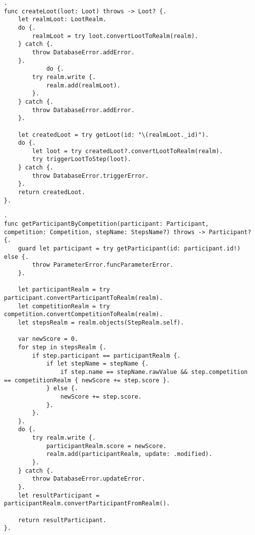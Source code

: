 \begin{lstlisting}[label=lst:code7, caption=Код функции createLoot].
func createLoot(loot: Loot) throws -> Loot? {.
	let realmLoot: LootRealm.
	do {.
		realmLoot = try loot.convertLootToRealm(realm).
	} catch {.
		throw DatabaseError.addError.
	}.
        	do {.
		try realm.write {.
			realm.add(realmLoot).
		}.
	} catch {.
		throw DatabaseError.addError.
	}.
       
	let createdLoot = try getLoot(id: "\(realmLoot._id)").
	do {.
		let loot = try createdLoot?.convertLootToRealm(realm).
		try triggerLootToStep(loot).
	} catch {.
		throw DatabaseError.triggerError.
	}.
	return createdLoot.
}.
\end{lstlisting}

\begin{lstlisting}[label=lst:code8, caption=Код функции getParticipantByCompetition].
func getParticipantByCompetition(participant: Participant, competition: Competition, stepName: StepsName?) throws -> Participant? {.
	guard let participant = try getParticipant(id: participant.id!) else {.
		throw ParameterError.funcParameterError.
	}.
        
	let participantRealm = try participant.convertParticipantToRealm(realm).
	let competitionRealm = try competition.convertCompetitionToRealm(realm).
	let stepsRealm = realm.objects(StepRealm.self).
        
	var newScore = 0.
	for step in stepsRealm {.
		if step.participant == participantRealm {.
			if let stepName = stepName {.
				if step.name == stepName.rawValue && step.competition == competitionRealm { newScore += step.score }.
			} else {.
				newScore += step.score.
			}.
		}.
	}.
	do {.
		try realm.write {.
			participantRealm.score = newScore.
			realm.add(participantRealm, update: .modified).
		}.
	} catch {.
		throw DatabaseError.updateError.
	}.
	let resultParticipant = participantRealm.convertParticipantFromRealm().
        
	return resultParticipant.
}.
\end{lstlisting}
